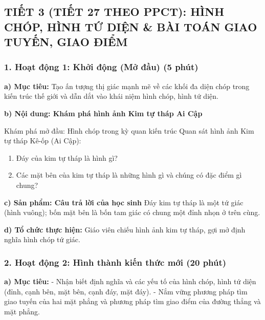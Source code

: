 \documentclass[12pt, a4paper]{article}
\begin{document}
\subsection*{TIẾT 3 (TIẾT 27 THEO PPCT): HÌNH CHÓP, HÌNH TỨ DIỆN \& BÀI TOÁN GIAO TUYẾN, GIAO ĐIỂM}

\subsubsection*{1. Hoạt động 1: Khởi động (Mở đầu) (5 phút)}

\noindent \textbf{a) Mục tiêu:}
Tạo ấn tượng thị giác mạnh mẽ về các khối đa diện chóp trong kiến trúc thế giới và dẫn dắt vào khái niệm hình chóp, hình tứ diện.

\noindent \textbf{b) Nội dung: Khám phá hình ảnh Kim tự tháp Ai Cập}
\begin{pedabox}{Khám phá mở đầu: Hình chóp trong kỳ quan kiến trúc}
Quan sát hình ảnh Kim tự tháp Kê-ốp (Ai Cập):
\begin{enumerate}[leftmargin=0.6cm]
    \item Đáy của kim tự tháp là hình gì?
    \item Các mặt bên của kim tự tháp là những hình gì và chúng có đặc điểm gì chung?
\end{enumerate}
\end{pedabox}

\noindent \textbf{c) Sản phẩm: Câu trả lời của học sinh}
Đáy kim tự tháp là một tứ giác (hình vuông); bốn mặt bên là bốn tam giác có chung một đỉnh nhọn ở trên cùng.

\noindent \textbf{d) Tổ chức thực hiện:}
Giáo viên chiếu hình ảnh kim tự tháp, gợi mở định nghĩa hình chóp tứ giác.

\subsubsection*{2. Hoạt động 2: Hình thành kiến thức mới (20 phút)}

\noindent \textbf{a) Mục tiêu:}
- Nhận biết định nghĩa và các yếu tố của hình chóp, hình tứ diện (đỉnh, cạnh bên, mặt bên, cạnh đáy, mặt đáy).
- Nắm vững phương pháp tìm giao tuyến của hai mặt phẳng và phương pháp tìm giao điểm của đường thẳng và mặt phẳng.
\end{document}

